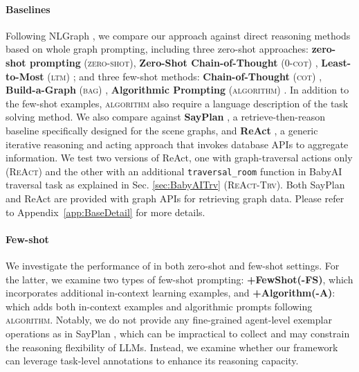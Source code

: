 \paragraph{Baselines} Following NLGraph \citep{NLGraph}, we compare our approach against direct reasoning methods based on whole graph prompting, including three zero-shot approaches: \textbf{zero-shot prompting} (\textsc{zero-shot}), \textbf{Zero-Shot Chain-of-Thought} (\textsc{0-cot}) \citep{zeroShotCot}, \textbf{Least-to-Most} (\textsc{ltm}) \citep{LTM}; and three few-shot methods: \textbf{Chain-of-Thought} (\textsc{cot}) \citep{CoT}, \textbf{Build-a-Graph} (\textsc{bag}) \citep{NLGraph}, \textbf{Algorithmic Prompting} (\textsc{algorithm}) \citep{NLGraph}. In addition to the few-shot examples, \textsc{algorithm} also require a language description of the task solving method. 
We also compare against \textbf{SayPlan} \citep{sayplan}, a retrieve-then-reason baseline specifically designed for the scene graphs, and \textbf{ReAct} \citep{react}, a generic iterative reasoning and acting approach that invokes database APIs to aggregate information. We test two versions of ReAct, one with graph-traversal actions only (\textsc{ReAct}) and the other with an additional \texttt{\small traversal\_room} function in BabyAI traversal task as explained in Sec. \ref{sec:BabyAITrv} (\textsc{ReAct-Trv}).
Both SayPlan and ReAct are provided with graph APIs for retrieving graph data. Please refer to Appendix~\ref{app:BaseDetail} for more details.

\paragraph{Few-shot \RwR}
We investigate the performance of \RwR in both zero-shot and few-shot settings. For the latter, we examine two types of few-shot prompting: \textbf{\RwR+FewShot(\RwR-FS)}, which incorporates additional in-context learning examples, and \textbf{\RwR+Algorithm(\RwR-A)}: which adds both in-context examples and algorithmic prompts following \textsc{algorithm}. Notably, we do not provide any fine-grained agent-level exemplar operations as in SayPlan \cite{sayplan}, which can be impractical to collect and may constrain the reasoning flexibility of LLMs. Instead, we examine whether our framework can leverage task-level annotations to enhance its reasoning capacity.


